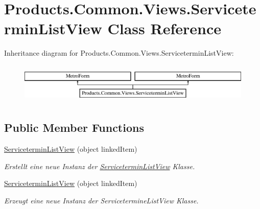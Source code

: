 \hypertarget{class_products_1_1_common_1_1_views_1_1_servicetermin_list_view}{}\section{Products.\+Common.\+Views.\+Servicetermin\+List\+View Class Reference}
\label{class_products_1_1_common_1_1_views_1_1_servicetermin_list_view}
Inheritance diagram for Products.\+Common.\+Views.\+Servicetermin\+List\+View\+:\begin{figure}[H]
\begin{center}
\leavevmode
\includegraphics[height=1.937716cm]{class_products_1_1_common_1_1_views_1_1_servicetermin_list_view}
\end{center}
\end{figure}
\subsection*{Public Member Functions}
\begin{DoxyCompactItemize}
\item 
\hyperlink{class_products_1_1_common_1_1_views_1_1_servicetermin_list_view_af24269d282ff7e3c95132e1ee62bde7b}{Servicetermin\+List\+View} (object linked\+Item)
\begin{DoxyCompactList}\small\item\em Erstellt eine neue Instanz der \hyperlink{class_products_1_1_common_1_1_views_1_1_servicetermin_list_view}{Servicetermin\+List\+View} Klasse. \end{DoxyCompactList}\item 
\hyperlink{class_products_1_1_common_1_1_views_1_1_servicetermin_list_view_af24269d282ff7e3c95132e1ee62bde7b}{Servicetermin\+List\+View} (object linked\+Item)
\begin{DoxyCompactList}\small\item\em Erzeugt eine neue Instanz der Servicetermine\+List\+View Klasse. \end{DoxyCompactList}\end{DoxyCompactItemize}
